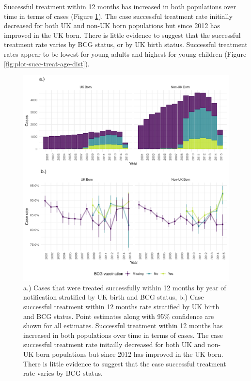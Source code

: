 \documentclass[11pt,twoside]{bristolthesis}
\begin{document}
  Successful treatment within 12 months has increased in both populations over time in terms of cases (Figure \ref{fig:plot-succ-treat-case-rate}). The case successful treatment rate initially decreased for both UK and non-UK born populations but since 2012 has improved in the UK born. There is little evidence to suggest that the successful treatment rate varies by BCG status, or by UK birth status. Successful treatment rates appear to be lowest for young adults and highest for young children (Figure \ref{fig:plot-succ-treat-age-dist}).
  \begin{figure}
  
  {\centering \includegraphics[width=0.8\linewidth]{chapters/tb-epi-england/figures/plot-succ-treat-case-rate} 
  
  }
  
  \caption{a.) Cases that were treated successfully within 12 months by year of notification stratified by UK birth and BCG status, b.) Case successful treatment within 12 months rate stratified by UK birth and BCG status. Point estimates along with 95\% confidence are shown for all estimates. Successful treatment within 12 months has increased in both populations over time in terms of cases. The case successful treatment rate initailly decreased for both UK and non-UK born populations but since 2012 has improved in the UK born. There is little evidence to suggest that the case successful treatment rate varies by BCG status.}\label{fig:plot-succ-treat-case-rate}
  \end{figure}
\end{document}
